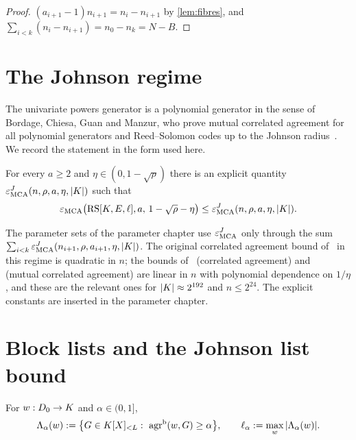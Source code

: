 \begin{proof}
$(a_{i+1}-1)n_{i+1}=n_i-n_{i+1}$ by \cref{lem:fibres}, and
$\sum_{i<k}(n_i-n_{i+1})=n_0-n_k=N-B$.
\end{proof}

\section{The Johnson regime}

The univariate powers generator is a polynomial generator in the sense of Bordage,
Chiesa, Guan and Manzur, who prove mutual correlated agreement for all polynomial
generators and Reed--Solomon codes up to the Johnson radius~\cite{BCGM26}. We record
the statement in the form used here.

\begin{theorem}\label{thm:mca-johnson}
For every $a\ge2$ and $\eta\in(0,1-\sqrt\rho)$ there is an explicit quantity
$\varepsilon^{J}_{\mathrm{MCA}}(n,\rho,a,\eta,|K|)$ such that
\[
\varepsilon_{\mathrm{MCA}}\bigl(\mathrm{RS}[K,E,\ell],a,\,1-\sqrt\rho-\eta\bigr)\le\varepsilon^{J}_{\mathrm{MCA}}(n,\rho,a,\eta,|K|).
\]
\end{theorem}

\begin{remark}\label{rem:johnson-constants}
The parameter sets of the parameter chapter use $\varepsilon^J_{\mathrm{MCA}}$ only through the sum
$\sum_{i<k}\varepsilon^J_{\mathrm{MCA}}(n_{i+1},\rho,a_{i+1},\eta,|K|)$. The original correlated
agreement bound of~\cite{BCIKS20} in this regime is quadratic in $n$; the bounds
of~\cite{BCHKS25} (correlated agreement) and~\cite{DKT26} (mutual correlated agreement)
are linear in $n$ with polynomial dependence on $1/\eta$, and these are the relevant
ones for $|K|\approx2^{192}$ and $n\le2^{24}$. The explicit constants are inserted in the parameter chapter.
\end{remark}

\section{Block lists and the Johnson list bound}

\begin{definition}\label{def:block-list}
For $w:D_0\to K$ and $\alpha\in(0,1]$,
\[
\Lambda_\alpha(w):=\bigl\{G\in\K[X]_{<L}:\ \agr(w,G)\ge\alpha\bigr\},\qquad
\ell_\alpha:=\max_{w}|\Lambda_\alpha(w)| .
\]
\end{definition}

